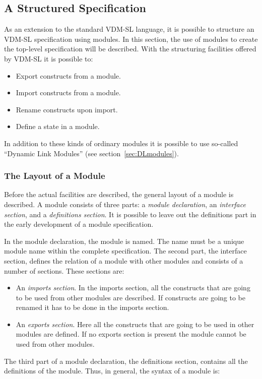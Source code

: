 \documentclass[\pformat,12pt]{article}
\begin{document}
\subsection{A Structured Specification}

As an extension to the standard VDM-SL language, it is possible to
structure an  VDM-SL specification using modules. In this section,
the use of modules to create the top-level specification will be described.
With the structuring facilities offered by  VDM-SL it is possible to:
\begin{itemize}
\item Export constructs from a module.
\item Import constructs from a module.
\item Rename constructs upon import.
\item Define a state in a module.
\end{itemize}

In addition to these kinds of ordinary modules it is possible to use
so-called ``Dynamic Link Modules'' (see section~\ref{sec:DLmodules}).

\subsubsection{The Layout of a Module}

Before the actual facilities are described, the general layout of a
module is described. A module consists of three parts: a {\it module
declaration}, an {\it interface section}, and a {\it definitions
section}. It is possible to leave out the definitions part in the
early development of a module specification.

In the module declaration, the module is named. The name must be a
unique module name within the complete specification. The second
part, the interface section, defines the relation of a module with other
modules and consists of a number of sections. These sections are:
\begin{itemize}

\item An {\it imports section}. In the imports section, all the
  constructs that are going to be used from other modules are
  described. If constructs are going to be renamed it has to be done
  in the imports section. 

\item An {\it exports section}. Here all the constructs that are going
  to be used in other modules are defined.
  If no exports section is present the
  module cannot be used from other modules.
\end{itemize}
The third part of a module declaration, the
definitions section, contains all the definitions of the module.
Thus, in general, the syntax of a module is:
\end{document}
